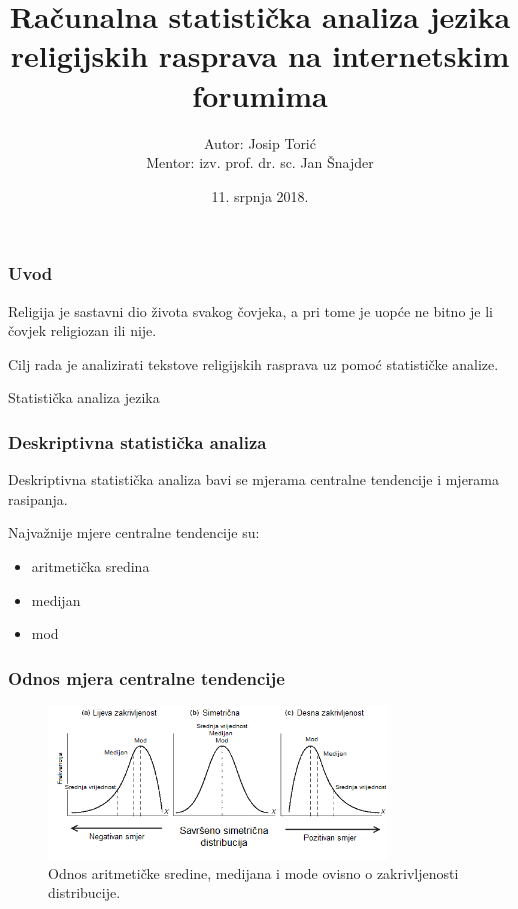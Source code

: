 \documentclass{beamer}
\title{Računalna statistička analiza jezika religijskih rasprava na internetskim forumima}
\author{Autor: Josip Torić \\ Mentor: izv. prof. dr. sc. Jan Šnajder}
\date{11. srpnja 2018.}
\institute{Fakultet elektrotehnike i računarstva, Sveučilište u Zagrebu}
\begin{document}
 
\frame{\titlepage}

\begin{frame}
\frametitle{Uvod}



Religija je sastavni dio života svakog čovjeka, a pri tome je uopće ne bitno je li čovjek religiozan ili nije.
\bigskip

Cilj rada je analizirati tekstove religijskih rasprava uz pomoć statističke analize.
\bigskip

\end{frame}


 
\begin{frame}
\begin{center}
\Huge Statistička analiza jezika
\end{center}

\end{frame}



\begin{frame}
\frametitle{Deskriptivna statistička analiza} 
Deskriptivna statistička analiza bavi se mjerama centralne tendencije i mjerama rasipanja.
\bigskip


Najvažnije mjere centralne tendencije su:
\begin{itemize}
 \item aritmetička sredina
 \item medijan
 \item mod
\end{itemize}

\end{frame}

\begin{frame}
\frametitle{Odnos mjera centralne tendencije}
\begin{figure}[]
	\centering
	\includegraphics[width=9cm]{img/meanmedianmode.png}
	\caption{Odnos aritmetičke sredine, medijana i mode ovisno o zakrivljenosti distribucije.}
	\label{fig:meanmedmode}
\end{figure}

\end{frame}
\end{document}
